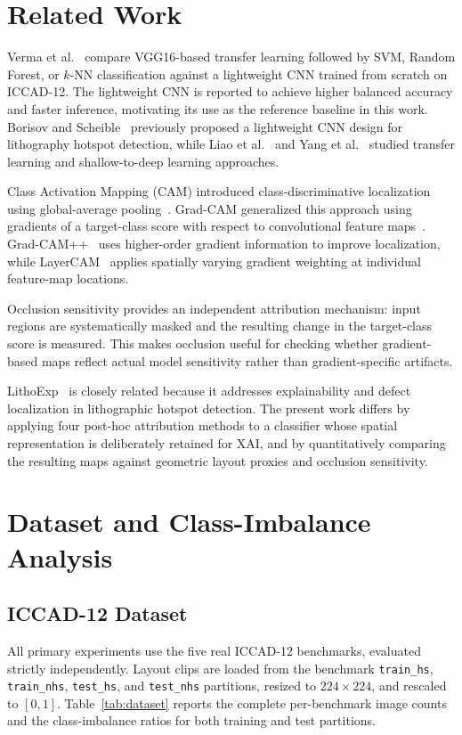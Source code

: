 \documentclass[conference]{IEEEtran}
\begin{document}
\section{Related Work}
Verma et al.~\cite{verma2026} compare VGG16-based transfer learning followed by SVM, Random Forest, or $k$-NN classification against a lightweight CNN trained from scratch on ICCAD-12. The lightweight CNN is reported to achieve higher balanced accuracy and faster inference, motivating its use as the reference baseline in this work. Borisov and Scheible~\cite{borisov2018} previously proposed a lightweight CNN design for lithography hotspot detection, while Liao et al.~\cite{liao2022} and Yang et al.~\cite{yang2017} studied transfer learning and shallow-to-deep learning approaches.

Class Activation Mapping (CAM) introduced class-discriminative localization using global-average pooling~\cite{zhou2016}. Grad-CAM generalized this approach using gradients of a target-class score with respect to convolutional feature maps~\cite{selvaraju2017}. Grad-CAM++~\cite{chattopadhyay2018} uses higher-order gradient information to improve localization, while LayerCAM~\cite{jiang2021layercam} applies spatially varying gradient weighting at individual feature-map locations.

Occlusion sensitivity provides an independent attribution mechanism: input regions are systematically masked and the resulting change in the target-class score is measured. This makes occlusion useful for checking whether gradient-based maps reflect actual model sensitivity rather than gradient-specific artifacts.

LithoExp~\cite{jiang2025lithoexp} is closely related because it addresses explainability and defect localization in lithographic hotspot detection. The present work differs by applying four post-hoc attribution methods to a classifier whose spatial representation is deliberately retained for XAI, and by quantitatively comparing the resulting maps against geometric layout proxies and occlusion sensitivity.

\section{Dataset and Class-Imbalance Analysis}

\subsection{ICCAD-12 Dataset}
All primary experiments use the five real ICCAD-12 benchmarks, evaluated strictly independently. Layout clips are loaded from the benchmark \texttt{train\_hs}, \texttt{train\_nhs}, \texttt{test\_hs}, and \texttt{test\_nhs} partitions, resized to $224\times224$, and rescaled to $[0,1]$. Table~\ref{tab:dataset} reports the complete per-benchmark image counts and the class-imbalance ratios for both training and test partitions.
\end{document}
